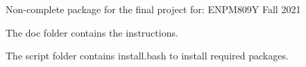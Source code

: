 Non-\/complete package for the final project for\+: E\+N\+P\+M809Y Fall 2021


\begin{DoxyItemize}
\item The {\ttfamily doc} folder contains the instructions.
\item The {\ttfamily script} folder contains install.\+bash to install required packages. 
\end{DoxyItemize}